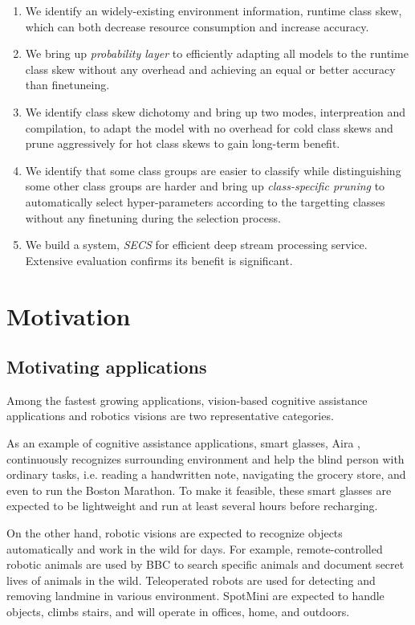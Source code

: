 \documentclass[pageno]{jpaper}
\begin{document}
\begin{enumerate}
  \item We identify an widely-existing environment information, runtime class skew, which can both decrease resource consumption and increase accuracy.
  \item We bring up \textit{probability layer} to efficiently adapting all models to the runtime class skew without any overhead and achieving an equal or better accuracy than finetuneing.
  \item We identify class skew dichotomy and bring up two modes, interpreation and compilation, to adapt the model with no overhead for cold class skews and prune aggressively for hot class skews to gain long-term benefit.
  \item We identify that some class groups are easier to classify while distinguishing some other class groups are harder and bring up \textit{class-specific pruning} to automatically select hyper-parameters according to the targetting classes without any finetuning during the selection process.
  \item We build a system, \textit{SECS} for efficient deep stream processing service. Extensive evaluation confirms its benefit is significant.
\end{enumerate}




\section{Motivation} \label{Motivation}
\subsection{Motivating applications}
Among the fastest growing applications, vision-based cognitive assistance applications and robotics visions are two representative categories.

As an example of cognitive assistance applications, smart glasses, Aira \cite{aria2018}, continuously recognizes surrounding environment and help the blind person with ordinary tasks, i.e. reading a handwritten note, navigating the grocery store, and even to run the Boston Marathon. To make it feasible, these smart glasses are expected to be lightweight and run at least several hours before recharging. 

On the other hand, robotic visions are expected to recognize objects automatically and work in the wild for days. For example, remote-controlled robotic animals are used by BBC \cite{bbc2018} to search specific animals and document secret lives of animals in the wild. Teleoperated robots \cite{landmine2018} are used for detecting and removing landmine in various environment. SpotMini \cite{spot-mini} are expected to handle objects, climbs stairs, and will operate in offices, home, and outdoors.
\end{document}
